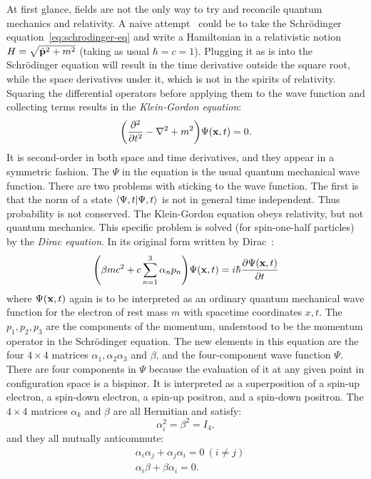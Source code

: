 At first glance, fields are not the only way to try and reconcile quantum mechanics and relativity. A naive attempt~\cite{Srednicki2007-mn} could be to take the Schrödinger equation~\ref{eq:schrodinger-eq} and write a Hamiltonian in a relativistic notion $H=\sqrt{\hat{\vb{p}}^2+m^2}$ (taking as usual $\hbar=c=1$). Plugging it as is into the Schrödinger equation will result in the time derivative outside the square root, while the space derivatives under it, which is not in the spirits of relativity. Squaring the differential operators before applying them to the wave function and collecting terms results in the \emph{Klein-Gordon equation}:
\begin{equation}
\qty(\pdv[2]{t}-\nabla^2+m^2)\Psi\qty(\vb{x},t)=0.
\label{eq:kg-wf}
\end{equation}
It is second-order in both space and time derivatives, and they appear in a symmetric fashion. The $\Psi$ in the equation is the usual quantum mechanical wave function. There are two problems with sticking to the wave function. The first is that the norm of a state $\braket{\Psi,t}$ is not in general time independent. Thus probability is not conserved. The Klein-Gordon equation obeys relativity, but not quantum mechanics. This specific problem is solved (for spin-one-half particles) by the \emph{Dirac equation}. In its original form written by Dirac~\cite{Dirac1981-rt}:
\begin{equation}
\qty(\beta m c^2 + c\sum^3_{n=1}\alpha_n p_n)\Psi\qty(\vb{x},t)=i\hbar\pdv{\Psi\qty(\vb{x},t)}{t}
\label{eq:dirac-wf}
\end{equation}
where $\Psi\qty(\vb{x},t)$ again is to be interpreted as an ordinary quantum mechanical wave function for the electron of rest mass $m$ with spacetime coordinates $x, t$. The $p_1,p_2,p_3$ are the components of the momentum, understood to be the momentum operator in the Schrödinger equation. The new elements in this equation are the four $4\times 4$ matrices $\alpha_1,\alpha_2\alpha_3$ and $\beta$, and the four-component wave function $\Psi$. There are four components in $\Psi$ because the evaluation of it at any given point in configuration space is a bispinor. It is interpreted as a superposition of a spin-up electron, a spin-down electron, a spin-up positron, and a spin-down positron. The $4\times 4$ matrices $\alpha_k$ and $\beta$ are all Hermitian and satisfy:
\begin{equation}
\alpha_i^2=\beta^2=I_4,
\end{equation}
and they all mutually anticommute:
\begin{equation}
\begin{split}
&\alpha_i \alpha_j + \alpha_j \alpha_i = 0 \:(i\neq j) \\
&\alpha_i \beta + \beta \alpha_i = 0.
\end{split}
\end{equation}
